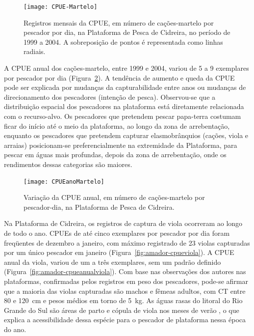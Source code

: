 \documentclass[a4paper,11pt,twoside,showtrims,onecolumn,openright,final]{memoir}
\begin{document}
%
%

\begin{figure}
\begin{center}
\texttt{[image: CPUE-Martelo]}
\end{center}
\caption[Registros mensais da CPUE, em número de cações-martelo por pescador por dia, 
         na Plataforma de Pesca de Cidreira, no período de 1999 a 2004.]
        {Registros mensais da CPUE, em número de cações-martelo por pescador por dia, 
         na Plataforma de Pesca de Cidreira, no período de 1999 a 2004. 
         A sobreposição de pontos é representada como linhas radiais.}
\label{fig:amador-cpuemartelo}
\end{figure}


A CPUE  anual dos cações-martelo, entre 1999 e 2004, 
variou de 5 a 9 exemplares por pescador por dia (Figura~\ref{fig:amador-cpueanualmartelo}). 
A tendência de aumento e queda da CPUE pode ser explicada por mudanças 
da capturabilidade entre anos ou mudanças de direcionamento 
dos pescadores  (intenção de pesca). Observou-se que a distribuição espacial dos pescadores na 
plataforma está diretamente relacionada com o recurso-alvo. Os pescadores 
que pretendem pescar papa-terra costumam ficar do início até o meio da plataforma, ao longo da 
zona de arrebentação, enquanto os pescadores que pretendem capturar elasmobrânquios 
(cações, viola e arraias) posicionam-se preferencialmente na extremidade da Plataforma, 
para pescar em águas mais profundas, depois da zona de arrebentação, onde os rendimentos 
dessas categorias são maiores. 

%
%

\begin{figure}
\begin{center}
\texttt{[image: CPUEanoMartelo]}
\end{center}
\caption{Variação da CPUE anual, em número de cações-martelo por pescador-dia, na Plataforma de Pesca de Cidreira.}
\label{fig:amador-cpueanualmartelo}
\end{figure}


Na Plataforma de Cidreira, os registros de captura de viola ocorreram ao longo de todo o ano.
CPUEs de até cinco exemplares por pescador por dia foram freqüentes de dezembro a janeiro, com 
máximo registrado de 23 violas capturadas por um único pescador em janeiro (Figura~\ref{fig:amador-cpueviola}). 
A CPUE anual da viola, variou de um a três exemplares, sem um padrão definido (Figura~\ref{fig:amador-cpueanualviola}). 
Com base nas observações dos autores nas plataformas, confirmadas pelos registros em peso dos pescadores, 
pode-se afirmar que a maioria das violas capturadas são machos e fêmeas adultos, 
com CT entre 80 e 120~cm e pesos médios em torno de 5~kg. As águas rasas do litoral do 
Rio Grande do Sul são áreas de parto e cópula de viola nos meses de verão \citep{lessa1986},  %
o que explica a acessibilidade dessa espécie para o pescador de plataforma nessa época do ano.
\end{document}
